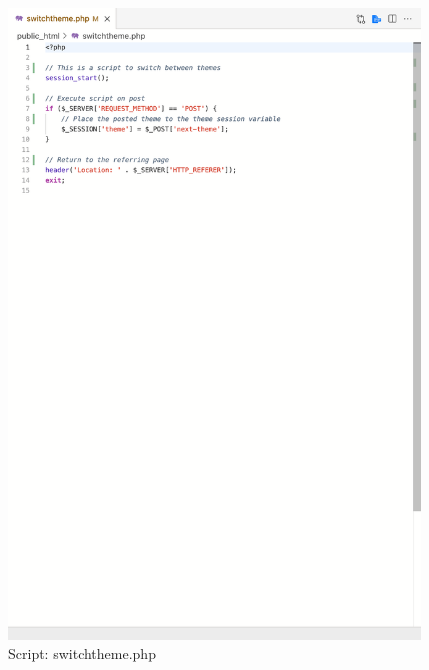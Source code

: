 \documentclass[12pt, letterpaper]{article}
\begin{document}
\begin{figure}[htbp]
	\centering
	\includegraphics[width=4.3in]{images/22-script-4.png}
	\caption{Script: switchtheme.php}
 \end{figure}

\end{document}

